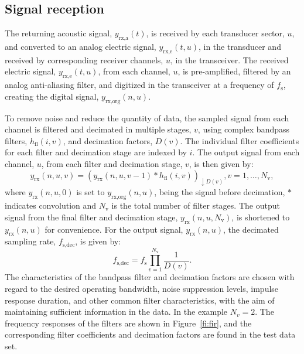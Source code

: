 \documentclass[preprint,12pt,TurnOnLineNumbers]{JASAnew}
\newcommand{\timesym}{t}
\newcommand{\samplesymt}{n}
\newcommand{\genidxsym}{i}
\newcommand{\channelsym}{u}
\newcommand{\stagesym}{v}
\newcommand{\nstages}{N_{\textrm{v}}}
\newcommand{\fs}{f_{\textrm{s}}}
\newcommand{\fsdec}{f_{\textrm{s,dec}}}
\newcommand{\yrxa}{y_{\textrm{rx,a}}}
\newcommand{\yrxe}{y_{\textrm{rx,e}}}
\newcommand{\yrx}{y_{\textrm{rx}}}
\newcommand{\yrxorg}{y_{\textrm{rx,org}}}
\newcommand{\decfac}{D}
\newcommand{\hfl}{h_{\textrm{fl}}}
\begin{document}
\subsection{Signal reception}

The returning acoustic signal, $\yrxa(\timesym)$, is received by each transducer sector, $\channelsym$, and converted to an analog electric signal, $\yrxe(\timesym,\channelsym)$, in the transducer and received by corresponding receiver channels, $\channelsym$, in the transceiver. The received electric signal, $\yrxe(\timesym,\channelsym)$, from each channel, $\channelsym$, is pre-amplified, filtered by an analog anti-aliasing filter, and digitized in the transceiver at a frequency of $\fs$, creating the digital signal, $\yrxorg(\samplesymt,\channelsym)$.

To remove noise and reduce the quantity of data, the sampled signal from each channel is filtered and decimated in multiple stages, $\stagesym$, using complex bandpass filters, $\hfl(\genidxsym,\stagesym)$, and decimation factors, $\decfac(\stagesym)$. The individual filter coefficients for each filter and decimation stage are indexed by $i$. The output signal from each channel, $\channelsym$, from each filter and decimation stage, $\stagesym$, is then given by:
%
\begin{equation}
\label{eq:yrx}
\yrx(\samplesymt,\channelsym,\stagesym) = \left( \yrx(\samplesymt,\channelsym,\stagesym-1) * \hfl(\genidxsym,\stagesym) \right)_{\downarrow \decfac(\stagesym)}, 
\stagesym = 1,\ldots,\nstages,
\end{equation}
%
where $\yrx(\samplesymt,\channelsym,0)$ is set to $\yrxorg(\samplesymt,\channelsym)$, being the signal before decimation, $*$ indicates convolution and $\nstages$ is the total number of filter stages. The output signal from the final filter and decimation stage, $\yrx(\samplesymt,\channelsym,\nstages)$, is shortened to $\yrx(\samplesymt,\channelsym)$ for convenience. For the output signal, $\yrx(\samplesymt,\channelsym)$, the decimated sampling rate, $\fsdec$, is given by:
%
\begin{equation}
\label{eq:fsdec}
\fsdec = \fs\prod_{\stagesym=1}^{\nstages} \frac{1}{\decfac(\stagesym)}.
\end{equation}
%
The characteristics of the bandpass filter and decimation factors are chosen with regard to the desired operating bandwidth, noise suppression levels, impulse response duration, and other common filter characteristics, with the aim of maintaining sufficient information in the data. In the example $N_v=2$. The frequency responses of the filters are shown in Figure~\ref{fi:fir}, and the corresponding filter coefficients and decimation factors are found in the test data set.
\end{document}
